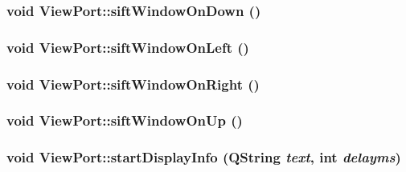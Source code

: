 \label{classViewPort_ad250b6cf4dd6d571128a7ad0d4d98175}
\hypertarget{classViewPort_aa05e98b5c021662068856f9b8f25a299}{
\subsubsection[{siftWindowOnDown}]{\setlength{\rightskip}{0pt plus 5cm}void ViewPort::siftWindowOnDown ()}}
\label{classViewPort_aa05e98b5c021662068856f9b8f25a299}
\hypertarget{classViewPort_ab8d8fbc8a150d158840e73dc3d28d4e9}{
\subsubsection[{siftWindowOnLeft}]{\setlength{\rightskip}{0pt plus 5cm}void ViewPort::siftWindowOnLeft ()}}
\label{classViewPort_ab8d8fbc8a150d158840e73dc3d28d4e9}
\hypertarget{classViewPort_ad75dd8cdf0fcefa9f3afb7af78ffa1fc}{
\subsubsection[{siftWindowOnRight}]{\setlength{\rightskip}{0pt plus 5cm}void ViewPort::siftWindowOnRight ()}}
\label{classViewPort_ad75dd8cdf0fcefa9f3afb7af78ffa1fc}
\hypertarget{classViewPort_a539a1c2895777e89b1431146ccb26a26}{
\subsubsection[{siftWindowOnUp}]{\setlength{\rightskip}{0pt plus 5cm}void ViewPort::siftWindowOnUp ()}}
\label{classViewPort_a539a1c2895777e89b1431146ccb26a26}
\hypertarget{classViewPort_a2618b2c40f1770ab153cbae4da9c5313}{
\subsubsection[{startDisplayInfo}]{\setlength{\rightskip}{0pt plus 5cm}void ViewPort::startDisplayInfo (QString {\em text}, \/  int {\em delayms})}}
